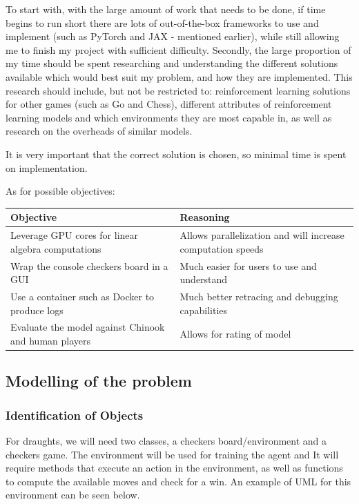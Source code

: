 \documentclass{article}
\makeatletter
\newcommand\subsubsubsection{\@startsection{paragraph}{4}{\z@}{-2.5ex\@plus -1ex \@minus -.25ex}{1.25ex \@plus .25ex}{\normalfont\normalsize\bfseries}}
\makeatother
\begin{document}
    To start with, with the large amount of work that needs to be done, if time begins to run short there are lots of out-of-the-box frameworks
    to use and implement (such as PyTorch and JAX - mentioned earlier), while still allowing me to finish my project with sufficient difficulty.
    Secondly, the large proportion of my time should be spent researching and understanding the different solutions available which would best
    suit my problem, and how they are implemented. This research should include, but not be restricted to: reinforcement learning solutions for
    other games (such as Go and Chess), different attributes of reinforcement learning models and which environments they are most capable in, as well
    as research on the overheads of similar models.

    It is very important that the correct solution is chosen, so minimal time is spent on implementation.

    As for possible objectives:
    \begin{center}
        \begin{tabular}{|m{15em}|m{15em}|}
            \hline 
            Objective & Reasoning \\
            \hline
            Leverage GPU cores for linear algebra computations & Allows parallelization and will increase computation speeds  \\      
            \hline
            Wrap the console checkers board in a GUI & Much easier for users to use and understand \\
            \hline
            Use a container such as Docker to produce logs & Much better retracing and debugging capabilities \\
            \hline
            Evaluate the model against Chinook and human players & Allows for rating of model \\
            \hline
        \end{tabular}
    \end{center}

    
    \subsection{Modelling of the problem}

    \subsubsection{Identification of Objects}

    \subsubsubsection{Draughts}
    For draughts, we will need two classes, a checkers board/environment and a checkers game. The environment will be used for training the agent and It will require methods that
    execute an action in the environment, as well as functions to compute the available moves and check for a win. An example of UML for this environment can be seen below. 
\end{document}
